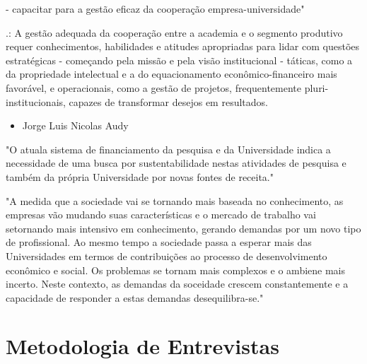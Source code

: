 - capacitar para a gestão eficaz da cooperação empresa-universidade"

.: A gestão adequada da cooperação entre a academia e o segmento produtivo requer conhecimentos, habilidades e atitudes apropriadas para lidar com questões estratégicas - começando pela missão e pela visão institucional - táticas, como a da propriedade intelectual e a do equacionamento econômico-financeiro mais favorável, e operacionais, como a gestão de projetos, frequentemente pluri-institucionais, capazes de transformar desejos em resultados. 

\begin{itemize}
\item Jorge Luis Nicolas Audy
\end{itemize}

"O atuala sistema de financiamento da pesquisa e da Universidade indica a necessidade de uma busca por sustentabilidade nestas atividades de pesquisa e também da própria Universidade por novas fontes de receita."

"A medida que a sociedade vai se tornando mais baseada no conhecimento, as empresas vão mudando suas características e o mercado de trabalho vai setornando mais intensivo em conhecimento, gerando demandas por um novo tipo de profissional. Ao mesmo tempo a sociedade passa a esperar mais das Universidades em termos de contribuições ao processo de desenvolvimento econômico e social. Os problemas se tornam mais complexos e o ambiene mais incerto. Neste contexto, as demandas da soceidade crescem constantemente e a capacidade de responder a estas demandas desequilibra-se."

\section{Metodologia de Entrevistas}
\label{cha:ensino}

